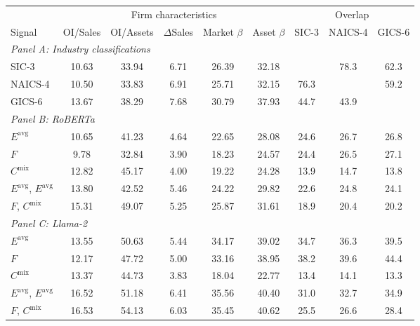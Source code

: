 \begin{table}[htbp]
{\footnotesize
\begin{adjustbox}{max width=\linewidth, max totalheight=0.75\textheight}
\begin{tabular}{lcccccccc}
\toprule
 & \multicolumn{5}{c}{Firm characteristics} & \multicolumn{3}{c}{Overlap} \\
\cmidrule(lr){2-6} \cmidrule(lr){7-9}
Signal & OI/Sales & OI/Assets & $\Delta$Sales & Market $\beta$ & Asset $\beta$ & SIC-3 & NAICS-4 & GICS-6 \\
\midrule
\multicolumn{9}{l}{\textit{Panel A: Industry classifications}} \\
SIC-3 & 10.63 & 33.94 & 6.71 & 26.39 & 32.18 &  & 78.3 & 62.3 \\
NAICS-4 & 10.50 & 33.83 & 6.91 & 25.71 & 32.15 & 76.3 &  & 59.2 \\
GICS-6 & 13.67 & 38.29 & 7.68 & 30.79 & 37.93 & 44.7 & 43.9 &  \\
\midrule
\multicolumn{9}{l}{\textit{Panel B: RoBERTa}} \\
$E^{\mathrm{avg}}$ & 10.65 & 41.23 & 4.64 & 22.65 & 28.08 & 24.6 & 26.7 & 26.8 \\
$F$ & \phantom{0}9.78 & 32.84 & 3.90 & 18.23 & 24.57 & 24.4 & 26.5 & 27.1 \\
$C^{\mathrm{mix}}$ & 12.82 & 45.17 & 4.00 & 19.22 & 24.28 & 13.9 & 14.7 & 13.8 \\
$E^{\mathrm{avg}}$, $E^{\mathrm{avg}}$ & 13.80 & 42.52 & 5.46 & 24.22 & 29.82 & 22.6 & 24.8 & 24.1 \\
$F$, $C^{\mathrm{mix}}$ & 15.31 & 49.07 & 5.25 & 25.87 & 31.61 & 18.9 & 20.4 & 20.2 \\
\midrule
\multicolumn{9}{l}{\textit{Panel C: Llama-2}} \\
$E^{\mathrm{avg}}$ & 13.55 & 50.63 & 5.44 & 34.17 & 39.02 & 34.7 & 36.3 & 39.5 \\
$F$ & 12.17 & 47.72 & 5.00 & 33.16 & 38.95 & 38.2 & 39.6 & 44.4 \\
$C^{\mathrm{mix}}$ & 13.37 & 44.73 & 3.83 & 18.04 & 22.77 & 13.4 & 14.1 & 13.3 \\
$E^{\mathrm{avg}}$, $E^{\mathrm{avg}}$ & 16.52 & 51.18 & 6.41 & 35.56 & 40.40 & 31.0 & 32.7 & 34.9 \\
$F$, $C^{\mathrm{mix}}$ & 16.53 & 54.13 & 6.03 & 35.45 & 40.62 & 25.5 & 26.6 & 28.4 \\
\bottomrule
\end{tabular}
\end{adjustbox}
}
\end{table}

